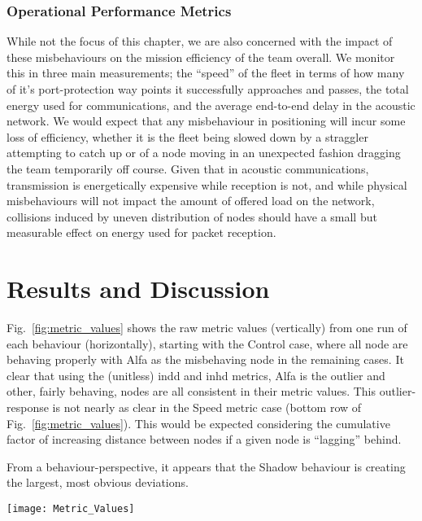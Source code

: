 \subsubsection{Operational Performance Metrics}
While not the focus of this chapter, we are also concerned with the impact of these misbehaviours on the mission efficiency of the team overall.
We monitor this in three main measurements; the ``speed'' of the fleet in terms of how many of it's port-protection way points it successfully approaches and passes, the total energy used for communications, and the average end-to-end delay in the acoustic network.
We would expect that any misbehaviour in positioning will incur some loss of efficiency, whether it is the fleet being slowed down by a straggler attempting to catch up or of a node moving in an unexpected fashion dragging the team temporarily off course.
Given that in acoustic communications, transmission is energetically expensive while reception is not, and while physical misbehaviours will not impact the amount of offered load on the network, collisions induced by uneven distribution of nodes should have a small but measurable effect on energy used for packet reception.

\section{Results and Discussion}
Fig.~\ref{fig:metric_values} shows the raw metric values (vertically) from one run of each behaviour (horizontally), starting with the Control case, where all node are behaving properly with Alfa as the misbehaving node in the remaining cases.
It clear that using the (unitless) \gls{indd} and \gls{inhd} metrics, Alfa is the outlier and other, fairly behaving, nodes are all consistent in their metric values.
This outlier-response is not nearly as clear in the Speed metric case (bottom row of Fig.~\ref{fig:metric_values}).
This would be expected considering the cumulative factor of increasing distance between nodes if a given node is ``lagging'' behind.

From a behaviour-perspective, it appears that the Shadow behaviour is creating the largest, most obvious deviations.

\begin{figure*}
  \centering  \texttt{[image: Metric\_Values]}
  \caption[Observed Metric Values for one simulation of each behaviour]{Observed Metric Values for one simulation of each behaviour ($x_{i,j}^{m,t}$ from \autoref{eq:d})}
  \label{fig:metric_values}
\end{figure*}

